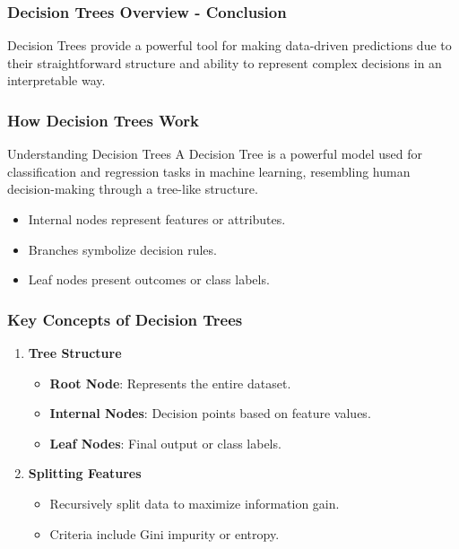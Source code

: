 \documentclass[aspectratio=169]{beamer}
\begin{document}
\begin{frame}[fragile]
    \frametitle{Decision Trees Overview - Conclusion}
    Decision Trees provide a powerful tool for making data-driven predictions due to their straightforward structure and ability to represent complex decisions in an interpretable way.
\end{frame}

\begin{frame}[fragile]
    \frametitle{How Decision Trees Work}
    \begin{block}{Understanding Decision Trees}
        A Decision Tree is a powerful model used for classification and regression tasks in machine learning, resembling human decision-making through a tree-like structure.
    \end{block}
    \begin{itemize}
        \item Internal nodes represent features or attributes.
        \item Branches symbolize decision rules.
        \item Leaf nodes present outcomes or class labels.
    \end{itemize}
\end{frame}

\begin{frame}[fragile]
    \frametitle{Key Concepts of Decision Trees}
    \begin{enumerate}
        \item \textbf{Tree Structure}
            \begin{itemize}
                \item \textbf{Root Node}: Represents the entire dataset.
                \item \textbf{Internal Nodes}: Decision points based on feature values.
                \item \textbf{Leaf Nodes}: Final output or class labels.
            \end{itemize}
        \item \textbf{Splitting Features}
            \begin{itemize}
                \item Recursively split data to maximize information gain.
                \item Criteria include Gini impurity or entropy.
            \end{itemize}
    \end{enumerate}
\end{frame}
\end{document}

